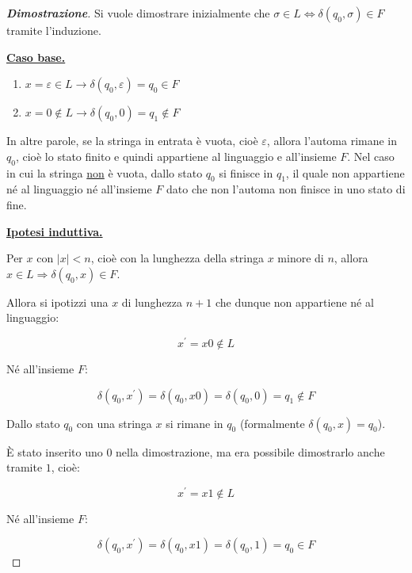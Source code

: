 \documentclass[a4paper]{article}
\begin{document}
	\begin{proof}[\textcolor{Blue3}{\textbf{Dimostrazione}}]
		Si vuole dimostrare inizialmente che $\sigma \in L \iff \delta\left(q_{0}, \sigma\right) \in F$ tramite l'induzione.\newline
		
		\noindent
		\textbf{\underline{Caso base.}}
		
		\begin{enumerate}
			\item $x = \varepsilon \in L \longrightarrow \delta\left(q_{0}, \varepsilon\right) = q_{0} \in F$
			\item $x = 0 \notin L \longrightarrow \delta\left(q_{0}, 0\right) = q_{1} \notin F$
		\end{enumerate}
	
		\noindent
		In altre parole, se la stringa in entrata è vuota, cioè $\varepsilon$, allora l'automa rimane in $q_{0}$, cioè lo stato finito e quindi appartiene al linguaggio e all'insieme $F$. Nel caso in cui la stringa \underline{non} è vuota, dallo stato $q_{0}$ si finisce in $q_{1}$, il quale non appartiene né al linguaggio né all'insieme $F$ dato che non l'automa non finisce in uno stato di fine.\newline
		
		\noindent
		\textbf{\underline{Ipotesi induttiva.}}\newline
		
		\noindent
		Per $x$ con $|x| < n$, cioè con la lunghezza della stringa $x$ minore di $n$, allora $x \in L \Longrightarrow \delta\left(q_{0}, x\right) \in F$.
		
		\noindent
		Allora si ipotizzi una $x$ di lunghezza $n + 1$ che dunque non appartiene né al linguaggio:
		
		\begin{equation*}
			x^{'} = x 0 \notin L
		\end{equation*}
	
		\noindent
		Né all'insieme $F$:
		
		\begin{equation*}
			\delta\left(q_{0}, x^{'}\right) = \delta\left(q_{0}, x0\right) = \delta\left(q_{0}, 0\right) = q_{1} \notin F
		\end{equation*}
	
		\noindent
		Dallo stato $q_{0}$ con una stringa $x$ si rimane in $q_{0}$ (formalmente $\delta\left(q_{0}, x\right) = q_{0}$).
		
		\noindent
		È stato inserito uno $0$ nella dimostrazione, ma era possibile dimostrarlo anche tramite $1$, cioè:
		
		\begin{equation*}
			x^{'} = x 1 \notin L
		\end{equation*}
	
		\noindent
		Né all'insieme $F$:
		
		\begin{equation*}
			\delta\left(q_{0}, x^{'}\right) = \delta\left(q_{0}, x1\right) = \delta\left(q_{0}, 1\right) = q_{0} \in F
		\end{equation*}
	\end{proof}
\end{document}
